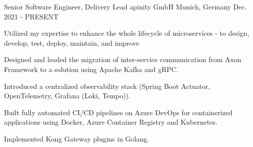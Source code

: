 

\begin{cventries}

    \cventry
    {Senior Software Engineer, Delivery Lead} %
    {apinity GmbH} %
    {Munich, Germany} %
    {Dec. 2021 - PRESENT} %
    {
        \begin{cvitems} %
            \item {Utilized my expertise to enhance the whole lifecycle of microservices - to design, develop, test, deploy, maintain, and improve}
            \item {Designed and leaded the migration of inter-service communication from Axon Framework to a solution using Apache Kafka and gRPC.}
            \item {Introduced a centralized observability stack (Spring Boot Actuator, OpenTelemetry, Grafana (Loki, Tempo)).}
            \item {Built fully automated CI/CD pipelines on Azure DevOps for containerized applications using Docker, Azure Container Registry and Kubernetes.}
            \item {Implemented Kong Gateway plugins in Golang.}
        \end{cvitems}
    }


\end{cventries}
